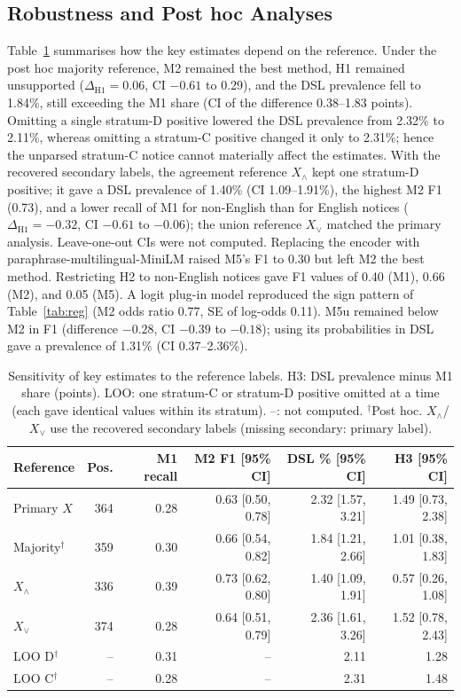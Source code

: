 \documentclass[runningheads]{llncs}
\begin{document}
\subsection{Robustness and Post hoc Analyses}
\label{sec:robust}
Table~\ref{tab:sens} summarises how the key estimates depend on the reference. Under the post hoc majority reference, M2 remained the best method, H1 remained unsupported ($\Delta_{\mathrm{H1}}=0.06$, CI $-0.61$ to 0.29), and the DSL prevalence fell to 1.84\%, still exceeding the M1 share (CI of the difference 0.38--1.83 points). Omitting a single stratum-D positive lowered the DSL prevalence from 2.32\% to 2.11\%, whereas omitting a stratum-C positive changed it only to 2.31\%; hence the unparsed stratum-C notice cannot materially affect the estimates. With the recovered secondary labels, the agreement reference $X_\wedge$ kept one stratum-D positive; it gave a DSL prevalence of 1.40\% (CI 1.09--1.91\%), the highest M2 F1 (0.73), and a lower recall of M1 for non-English than for English notices ($\Delta_{\mathrm{H1}}=-0.32$, CI $-0.61$ to $-0.06$); the union reference $X_\vee$ matched the primary analysis. Leave-one-out CIs were not computed. Replacing the encoder with paraphrase-multilingual-MiniLM raised M5's F1 to 0.30 but left M2 the best method. Restricting H2 to non-English notices gave F1 values of 0.40 (M1), 0.66 (M2), and 0.05 (M5). A logit plug-in model reproduced the sign pattern of Table~\ref{tab:reg} (M2 odds ratio 0.77, SE of log-odds 0.11). M5u remained below M2 in F1 (difference $-0.28$, CI $-0.39$ to $-0.18$); using its probabilities in DSL gave a prevalence of 1.31\% (CI 0.37--2.36\%).

\begin{table}[t]
\caption{Sensitivity of key estimates to the reference labels. H3: DSL prevalence minus M1 share (points). LOO: one stratum-C or stratum-D positive omitted at a time (each gave identical values within its stratum). --: not computed. $^\dagger$Post hoc. $X_\wedge$/$X_\vee$ use the recovered secondary labels (missing secondary: primary label).}\label{tab:sens}
\centering
\setlength{\tabcolsep}{4pt}
\begin{tabular}{lrrrrr}
\toprule
Reference & Pos. & M1 recall & M2 F1 [95\% CI] & DSL \% [95\% CI] & H3 [95\% CI] \\
\midrule
Primary $X$ & 364 & 0.28 & 0.63 [0.50, 0.78] & 2.32 [1.57, 3.21] & 1.49 [0.73, 2.38] \\
Majority$^\dagger$ & 359 & 0.30 & 0.66 [0.54, 0.82] & 1.84 [1.21, 2.66] & 1.01 [0.38, 1.83] \\
$X_\wedge$ & 336 & 0.39 & 0.73 [0.62, 0.80] & 1.40 [1.09, 1.91] & 0.57 [0.26, 1.08] \\
$X_\vee$ & 374 & 0.28 & 0.64 [0.51, 0.79] & 2.36 [1.61, 3.26] & 1.52 [0.78, 2.43] \\
LOO D$^\dagger$ & -- & 0.31 & -- & 2.11 & 1.28 \\
LOO C$^\dagger$ & -- & 0.28 & -- & 2.31 & 1.48 \\
\bottomrule
\end{tabular}
\end{table}
\end{document}
